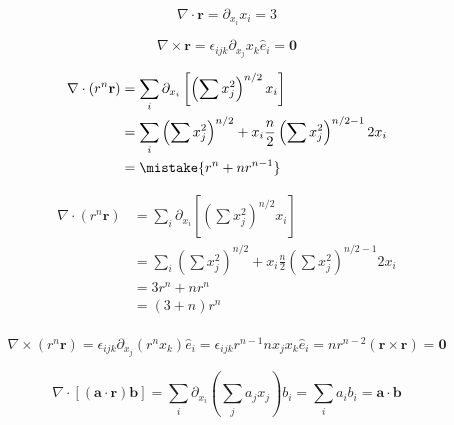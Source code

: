 \documentclass[12pt]{article}
\begin{document}


\begin{equation}
    \nabla \cdot \mathbf{r} = \partial_{x_{i}} x_{i} = 3
\end{equation}

\begin{equation}
    \nabla \times \mathbf{r} = \epsilon_{ijk} \partial_{x_{j}} x_{k} \hat{e}_{i} = \mathbf{0}
\end{equation}


\begin{equation}
\begin{split}
    \nabla \cdot (r^{n} \mathbf{r}) &= \sum_{i} \partial_{x_{i}} \left[ \left( \sum x_{j}^{2} \right)^{n/2} x_{i} \right] \\
    &= \sum_{i} \left( \sum x_{j}^{2} \right)^{n/2} + x_{i} \frac{n}{2} \left( \sum x_{j}^{2} \right)^{n/2 - 1} 2x_{i} \\
    &= \mistake{r^{n} + n r^{n-1}}
\end{split}
\end{equation}

\begin{correction}
    \begin{equation}
    \begin{split}
        \nabla \cdot (r^{n} \mathbf{r}) &= \sum_{i} \partial_{x_{i}} \left[ \left( \sum x_{j}^{2} \right)^{n/2} x_{i} \right] \\
        &= \sum_{i} \left( \sum x_{j}^{2} \right)^{n/2} + x_{i} \frac{n}{2} \left( \sum x_{j}^{2} \right)^{n/2 - 1} 2x_{i} \\
        &= 3r^{n} + n r^{n} \\
        &= (3 + n) r^{n} \\
    \end{split}
    \end{equation}
\end{correction}

\begin{equation}
    \nabla \times (r^{n} \mathbf{r}) = \epsilon_{ijk} \partial_{x_{j}} (r^{n} x_{k}) \hat{e}_{i} = \epsilon_{ijk} r^{n-1} n x_{j} x_{k} \hat{e}_{i} = n r^{n-2} (\mathbf{r} \times \mathbf{r}) = \mathbf{0}
\end{equation}


\begin{equation}
    \nabla \cdot [(\mathbf{a} \cdot \mathbf{r}) \mathbf{b}] = \sum_{i} \partial_{x_{i}} \left( \sum_{j} a_{j} x_{j} \right) b_{i} = \sum_{i} a_{i} b_{i} = \mathbf{a} \cdot \mathbf{b}
\end{equation}
\end{document}
